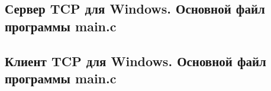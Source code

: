 \documentclass[12pt,a4paper]{report}
\begin{document}
\subsection{Сервер TCP для Windows. Основной файл программы main.c}

\subsection{Клиент TCP для Windows. Основной файл программы main.c}

%
\end{document}
